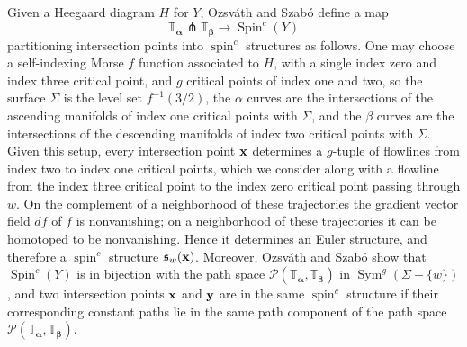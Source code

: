 \documentclass[11pt,reqno]{amsart}
\theoremstyle{definition}
\theoremstyle{remark}
\newcommand{\T}{\mathbb{T}}
\DeclareMathOperator{\spin}{{spin}}
\DeclareMathOperator{\Spin}{{Spin}}
\DeclareMathOperator{\Sym}{{Sym}}
\newcommand{\alphas}{\boldsymbol \alpha}
\newcommand{\betas}{\boldsymbol \beta}
\numberwithin{equation}{section}
\begin{document}
Given a Heegaard diagram $H$ for $Y$, Ozsv{\'a}th  and Szab{\'o} \cite[Section 2.6]{OSDisks} define a map 
%
\[ \T_{\alphas} \pitchfork \T_{\betas} \rightarrow \Spin^c(Y)\]
%
partitioning intersection points into $\spin^c$ structures as follows. One may choose a self-indexing Morse $f$ function associated to $H$, with a single index zero and index three critical point, and $g$ critical points of index one and two, so the surface $\Sigma$ is the level set $f^{-1}(3/2)$, the $\alpha$ curves are the intersections of the ascending manifolds of index one critical points with $\Sigma$, and the $\beta$ curves are the intersections of the descending manifolds of index two critical points with $\Sigma$. Given this setup, every intersection point ${\bf x}$ determines a $g$-tuple of flowlines from index two to index one critical points, which we consider along with a flowline from the index three critical point to the index zero critical point passing through $w$. On the complement of a neighborhood of these trajectories the gradient vector field $df$ of $f$ is nonvanishing; on a neighborhood of these trajectories it can be homotoped to be nonvanishing. Hence it determines an Euler structure, and therefore a $\spin^c$ structure $\mathfrak s_w({\bf x})$. Moreover, Ozsv{\'a}th and Szab{\'o} show \cite[Section 2.4]{OSDisks} that $\Spin^c(Y)$ is in bijection with the path space $\mathcal P(\T_{\alphas}, \T_{\betas})$ in $\Sym^g(\Sigma -\{w\})$, and two intersection points ${\bf x}$ and ${\bf y}$ are in the same $\spin^c$ structure if their corresponding constant paths lie in the same path component of the path space $\mathcal P(\T_{\alphas}, \T_{\betas})$.
\end{document}
